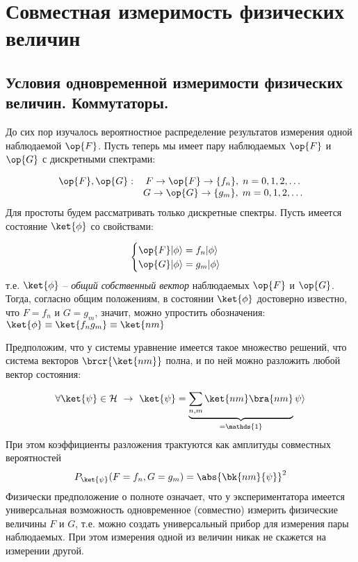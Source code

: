 \chapter{Совместная измеримость физических величин}

\section{Условия одновременной измеримости физических величин. Коммутаторы.}

До сих пор изучалось вероятностное распределение результатов измерения одной наблюдаемой $\op{F}$. Пусть теперь мы имеет пару наблюдаемых $\op{F}$ и $\op{G}$ с дискретными спектрами:

$$
\begin{array}{lcl}
\op{F}, \op{G}:  & F \rightarrow \op{F} \rightarrow \{f_n\}, \; n=0,1,2,\dots\\
                 & G \rightarrow \op{G} \rightarrow \{g_m\}, \; m=0,1,2,\dots
\end{array}
$$%
%
Для простоты будем рассматривать только дискретные спектры. Пусть имеется состояние $\ket{\phi}$ со свойствами:

\begin{equation}
\label{eq:4_1_1}
  \begin{cases}
    \op{F} |\phi \rangle = f_n |\phi \rangle\\
    \op{G} |\phi \rangle = g_m |\phi \rangle
  \end{cases} 
\end{equation}%
%
т.е. $\ket{\phi}$ -- {\em общий собственный вектор} наблюдаемых $\op{F}$ и $\op{G}$. Тогда, согласно общим положениям, в состоянии $\ket{\phi}$ достоверно известно, что $F = f_n$ и $G=g_m$, значит, можно упростить обозначения: $\ket{\phi} \equiv \ket{f_n g_m} \equiv \ket{nm}$

Предположим, что у системы уравнение имеется такое множество решений, что система векторов $\brcr{\ket{nm}}$ полна, и по ней можно разложить любой вектор состояния:

\begin{equation}
  \label{eq:4_1_2}
  \forall \ket{\psi} \in \mathcal{H} ~\rightarrow ~ \ket{\psi} =
      \underbrace{\sum_{n,m}\ket{nm}\bra{nm}}_{=\mathds{1}} \psi \rangle 
\end{equation}%
%
При этом коэффициенты разложения трактуются как амплитуды совместных вероятностей
$$
  P_{\ket{\psi}}(F = f_n, G = g_m) = \abs{\bk{nm}{\psi}}^2
$$%
%
Физически предположение о полноте означает, что у экспериментатора имеется универсальная возможность одновременное (совместно) измерить физические величины $F$ и $G$, т.е. можно создать универсальный прибор для измерения пары наблюдаемых. При этом измерения одной из величин никак не скажется на измерении другой.

